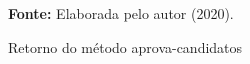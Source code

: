 \begin{figure}[ht!]
\centering

\caption{\textmd{Retorno do método aprova-candidatos}}
\label{fig:retaprovacandidatos}

\par\medskip\textbf{Fonte:} Elaborada pelo autor (2020). \par\medskip

\end{figure}
